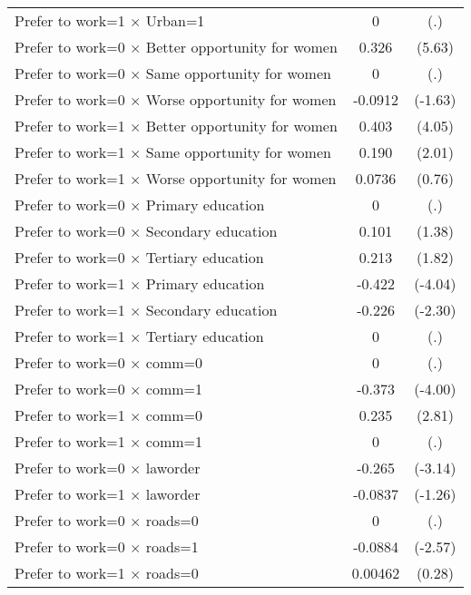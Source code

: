 {\begin{longtable}{l*{1}{cc}}
Prefer to work=1 $\times$ Urban=1&           0         &         (.)\\
Prefer to work=0 $\times$ Better opportunity for women&       0.326\sym{***}&      (5.63)\\
Prefer to work=0 $\times$ Same opportunity for women&           0         &         (.)\\
Prefer to work=0 $\times$ Worse opportunity for women&     -0.0912         &     (-1.63)\\
Prefer to work=1 $\times$ Better opportunity for women&       0.403\sym{***}&      (4.05)\\
Prefer to work=1 $\times$ Same opportunity for women&       0.190\sym{*}  &      (2.01)\\
Prefer to work=1 $\times$ Worse opportunity for women&      0.0736         &      (0.76)\\
Prefer to work=0 $\times$ Primary education&           0         &         (.)\\
Prefer to work=0 $\times$ Secondary education&       0.101         &      (1.38)\\
Prefer to work=0 $\times$ Tertiary education&       0.213         &      (1.82)\\
Prefer to work=1 $\times$ Primary education&      -0.422\sym{***}&     (-4.04)\\
Prefer to work=1 $\times$ Secondary education&      -0.226\sym{*}  &     (-2.30)\\
Prefer to work=1 $\times$ Tertiary education&           0         &         (.)\\
Prefer to work=0 $\times$ comm=0&           0         &         (.)\\
Prefer to work=0 $\times$ comm=1&      -0.373\sym{***}&     (-4.00)\\
Prefer to work=1 $\times$ comm=0&       0.235\sym{**} &      (2.81)\\
Prefer to work=1 $\times$ comm=1&           0         &         (.)\\
Prefer to work=0 $\times$ laworder&      -0.265\sym{**} &     (-3.14)\\
Prefer to work=1 $\times$ laworder&     -0.0837         &     (-1.26)\\
Prefer to work=0 $\times$ roads=0&           0         &         (.)\\
Prefer to work=0 $\times$ roads=1&     -0.0884\sym{*}  &     (-2.57)\\
Prefer to work=1 $\times$ roads=0&     0.00462         &      (0.28)\\

\end{longtable}}
